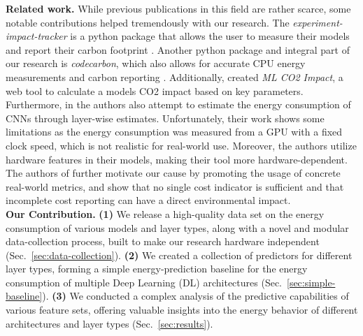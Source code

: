 \textbf{Related work.} While previous publications in this field are rather scarce, some notable contributions helped tremendously with our research. The \emph{experiment-impact-tracker} is a python package that allows the user to measure their models and report their carbon footprint \citep{impact-tracker_DBLP:journals/corr/abs-2002-05651}. Another python package and integral part of our research is \emph{codecarbon}, which also allows for accurate CPU energy measurements and carbon reporting \citep{codecarbon}.  Additionally, \citet{impact_DBLP:journals/corr/abs-1910-09700} created \emph{ML CO2 Impact}, a web tool to calculate a models CO2 impact based on key parameters. Furthermore, in \citet{NeuralPower_DBLP:journals/corr/abs-1710-05420} the authors also  attempt to estimate the energy consumption of CNNs through layer-wise estimates. Unfortunately, their work shows some limitations as the energy consumption was measured from a GPU with a fixed clock speed, which is not realistic for real-world use. Moreover, the authors utilize hardware features in their models, making their tool more hardware-dependent. The authors of \citet{misnomer} further motivate our cause by promoting the usage of concrete real-world metrics, and show that no single cost indicator is sufficient and that incomplete cost reporting can have a direct environmental impact. \\

\textbf{Our Contribution.} \textbf{(1)} We release a high-quality data set on the energy consumption of various models and layer types, along with a novel and modular data-collection process, built to make our research hardware independent (Sec.~\ref{sec:data-collection}). \textbf{(2)} We created a collection of predictors for different layer types, forming a simple energy-prediction baseline for the energy consumption of multiple Deep Learning (DL) architectures (Sec.~\ref{sec:simple-baseline}). \textbf{(3)} We conducted a complex analysis of the predictive capabilities of various feature sets, offering valuable insights into the energy behavior of different architectures and layer types (Sec.~\ref{sec:results}).